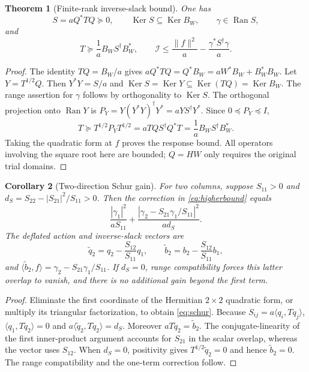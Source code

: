 \documentclass[11pt,a4paper]{article}
\newcommand{\Ran}{\operatorname{Ran}}
\newcommand{\Ker}{\operatorname{Ker}}
\newcommand{\ip}[2]{\langle #1,#2\rangle}
\newcommand{\norm}[1]{\lVert #1\rVert}
\newcommand{\Iresp}{\mathcal I}
\newtheorem{theorem}{Theorem}[section]
\newtheorem{corollary}[theorem]{Corollary}
\theoremstyle{definition}
\theoremstyle{remark}
\numberwithin{equation}{section}
\begin{document}
\begin{theorem}[Finite-rank inverse-slack bound]\label{thm:higher}
One has
\[
 S=aQ^*TQ\succeq0,\qquad
 \Ker S\subseteq\Ker B_{\!W},\qquad \gamma\in\Ran S,
\]
and
\begin{equation}\label{eq:higherbound}
 T\succeq\frac1a B_{\!W}S^\dagger B_{\!W}^*,\qquad
 \Iresp\le\frac{\norm f^2}{a}
                        -\frac{\gamma^*S^\dagger\gamma}{a}.
\end{equation}
\end{theorem}
\begin{proof}
The identity $TQ=B_{\!W}/a$ gives
$aQ^*TQ=Q^*B_{\!W}=aW^*B_{\!W}+B_{\!W}^*B_{\!W}$.
Let $Y=T^{1/2}Q$. Then $Y^*Y=S/a$ and
$\Ker S=\Ker Y\subseteq\Ker(TQ)=\Ker B_{\!W}$.
The range assertion for $\gamma$ follows by orthogonality to $\Ker S$.
The orthogonal projection onto $\Ran Y$ is
$P_Y=Y(Y^*Y)^\dagger Y^*=aYS^\dagger Y^*$.
Since $0\preceq P_Y\preceq I$,
\[
 T\succeq T^{1/2}P_YT^{1/2}
 =aTQS^\dagger Q^*T
 =\frac1a B_{\!W}S^\dagger B_{\!W}^*.
\]
Taking the quadratic form at $f$ proves the response bound. All
operators involving the square root here are bounded; $Q=HW$ only
requires the original trial domains.
\end{proof}

\begin{corollary}[Two-direction Schur gain]\label{cor:schur}
For two columns, suppose $S_{11}>0$ and
$d_S=S_{22}-|S_{21}|^2/S_{11}>0$. Then the correction in
\eqref{eq:higherbound} equals
\begin{equation}\label{eq:schur}
 \frac{|\gamma_1|^2}{aS_{11}}+
 \frac{|\gamma_2-S_{21}\gamma_1/S_{11}|^2}{ad_S}.
\end{equation}
The deflated action and inverse-slack vectors are
\[
 \widetilde q_2=q_2-\frac{S_{12}}{S_{11}}q_1,\qquad
 \widetilde b_2=b_2-\frac{S_{12}}{S_{11}}b_1,
\]
and
$\ip{\widetilde b_2}f=\gamma_2-S_{21}\gamma_1/S_{11}$.
If $d_S=0$, range compatibility forces this latter overlap to vanish,
and there is no additional gain beyond the first term.
\end{corollary}
\begin{proof}
Eliminate the first coordinate of the Hermitian $2\times2$ quadratic
form, or multiply its triangular factorization, to obtain
\eqref{eq:schur}. Because $S_{ij}=a\ip{q_i}{Tq_j}$,
$\ip{q_1}{T\widetilde q_2}=0$ and
$a\ip{\widetilde q_2}{T\widetilde q_2}=d_S$.
Moreover $aT\widetilde q_2=\widetilde b_2$.
The conjugate-linearity of the first inner-product argument accounts
for $S_{21}$ in the scalar overlap, whereas the vector uses $S_{12}$.
When $d_S=0$, positivity gives
$T^{1/2}\widetilde q_2=0$ and hence $\widetilde b_2=0$.
The range compatibility and the one-term correction follow.
\end{proof}
\end{document}
